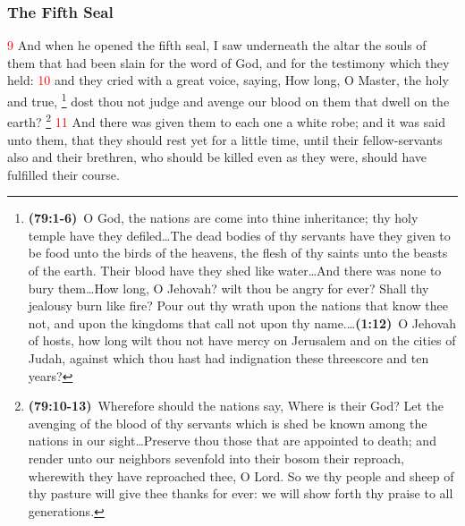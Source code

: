 \documentclass[12pt,twoside]{memoir}
\newcommand{\cbibleref}[3]{\textbf{\ibibleverse[textit]{#1}(#2)}\ {#3}}
\newcommand{\cbiblefootduo}[6]{\footnote{\cbibleref{#1}{#2}{#3}\ldots \cbibleref{#4}{#5}{#6}}}
\newcommand{\vnum}[1]{\textcolor{red}{\normalsize{#1}}}
\begin{document}
\subsubsection*{The Fifth Seal}
\vnum{9} And when he opened the fifth seal, I saw underneath the altar the souls of them that had been slain for the word of God, and for the testimony which they held: %
\vnum{10} and they cried with a great voice, saying, How long, O Master, the holy and true,%
	\cbiblefootduo{Psalms}{79:1-6}{O God, the nations are come into thine inheritance; thy holy temple have they defiled\ldots The dead bodies of thy servants have they given to be food unto the birds of the heavens, the flesh of thy saints unto the beasts of the earth. Their blood have they shed like water\ldots And there was none to bury them\ldots How long, O Jehovah? wilt thou be angry for ever? Shall thy jealousy burn like fire? Pour out thy wrath upon the nations that know thee not, and upon the kingdoms that call not upon thy name.}%
				{Zechariah}{1:12}{O Jehovah of hosts, how long wilt thou not have mercy on Jerusalem and on the cities of Judah, against which thou hast had indignation these threescore and ten years?}
 dost thou not judge and avenge our blood on them that dwell on the earth?%
 	\footnote{\cbibleref{Psalms}{79:10-13}{Wherefore should the nations say, Where is their God? Let the avenging of the blood of thy servants which is shed be known among the nations in our sight\ldots Preserve thou those that are appointed to death; and render unto our neighbors sevenfold into their bosom their reproach, wherewith they have reproached thee, O Lord. So we thy people and sheep of thy pasture will give thee thanks for ever: we will show forth thy praise to all generations.}
 	} %
\vnum{11} And there was given them to each one a white robe; and it was said unto them, that they should rest yet for a little time, until their fellow-servants also and their brethren, who should be killed even as they were, should have fulfilled their course.
\end{document}
